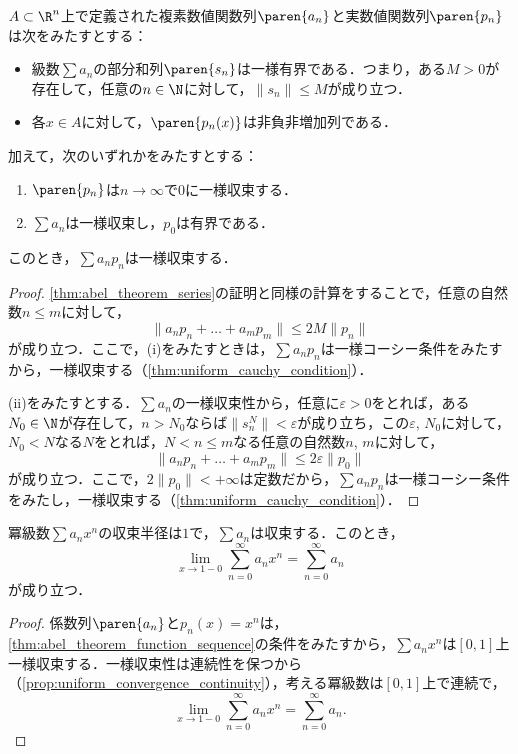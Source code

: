 \documentclass[a4paper,10pt]{ltjsarticle}
\begin{document}
\begin{MyTheorem}
  \(A \subset \R^n\)上で定義された複素数値関数列\(\paren{a_n}\)と実数値関数列\(\paren{p_n}\)は次をみたすとする：
  \begin{itemize}
    \item 級数\(\sum a_n\)の部分和列\(\paren{s_n}\)は一様有界である．つまり，ある\(M > 0\)が存在して，任意の\(n \in \N\)に対して，\(\|s_n\| \le M\)が成り立つ．
    \item 各\(x\in A\)に対して，\(\paren{p_n(x)}\)は非負非増加列である．
  \end{itemize}
  加えて，次のいずれかをみたすとする：
  \begin{enumerate}
    \item \(\paren{p_n}\)は\(n \to \infty\)で\(0\)に一様収束する．
    \item \(\sum a_n\)は一様収束し，\(p_0\)は有界である．
  \end{enumerate}
  このとき，\(\sum a_n p_n\)は一様収束する．
\end{MyTheorem}
\begin{proof}
  \cref{thm:abel_theorem_series}の証明と同様の計算をすることで，任意の自然数\(n \le m\)に対して，
  \[ \|a_np_n + \dots + a_mp_m\| \le 2M \|p_n\| \]
  が成り立つ．ここで，(i)をみたすときは，\(\sum a_n p_n\)は一様コーシー条件をみたすから，一様収束する（\cref{thm:uniform_cauchy_condition}）．

  (ii)をみたすとする．\(\sum a_n\)の一様収束性から，任意に\(\varepsilon > 0\)をとれば，ある\(N_0 \in \N\)が存在して，\(n > N_0\)ならば\(\|s^N_n\| < \varepsilon\)が成り立ち，この\(\varepsilon\), \(N_0\)に対して，\(N_0 < N\)なる\(N\)をとれば，\(N < n \le m\)なる任意の自然数\(n\), \(m\)に対して，
  \[ \|a_np_n + \dots + a_mp_m\| \le 2\varepsilon \|p_0\| \]
  が成り立つ．ここで，\(2\|p_0\| < +\infty\)は定数だから，\(\sum a_n p_n\)は一様コーシー条件をみたし，一様収束する（\cref{thm:uniform_cauchy_condition}）．
\end{proof}

\begin{MyTheorem}
  冪級数\(\sum a_n x^n\)の収束半径は\(1\)で，\(\sum a_n\)は収束する．このとき，
  \[ \lim_{x \to 1-0} \sum_{n=0}^\infty a_n x^n = \sum_{n=0}^\infty a_n \]
  が成り立つ．
\end{MyTheorem}
\begin{proof}
  係数列\(\paren{a_n}\)と\(p_n(x) = x^n\)は，\cref{thm:abel_theorem_function_sequence}の条件をみたすから，\(\sum a_n x^n\)は\([0, 1]\)上一様収束する．一様収束性は連続性を保つから（\cref{prop:uniform_convergence_continuity}），考える冪級数は\([0, 1]\)上で連続で，
  \[ \lim_{x \to 1-0} \sum_{n=0}^\infty a_n x^n = \sum_{n=0}^\infty a_n. \]
\end{proof}
\end{document}
